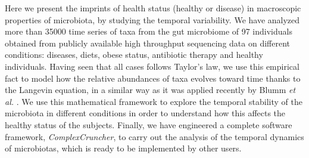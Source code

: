 Here we present the imprints of health status (healthy or disease) in macroscopic properties of microbiota, by studying the temporal variability. We have analyzed more than 35000 time series of taxa from the gut microbiome of 97 individuals obtained from publicly available high throughput sequencing data on different conditions: diseases, diets, obese status, antibiotic therapy and healthy individuals. Having seen that all cases follows Taylor's law, we use this empirical fact to model how the relative abundances of taxa evolves toward time thanks to the Langevin equation, in a similar way as it was applied recently by Blumm {\it et al.} \cite{ranking}. We use this mathematical framework to explore the temporal stability of the microbiota in different conditions in order to understand how this affects the healthy status of the subjects. Finally, we have engineered a complete software framework, {\it ComplexCruncher}, to carry out the analysis of the temporal dynamics of microbiotas, which is ready to be implemented by other users.
